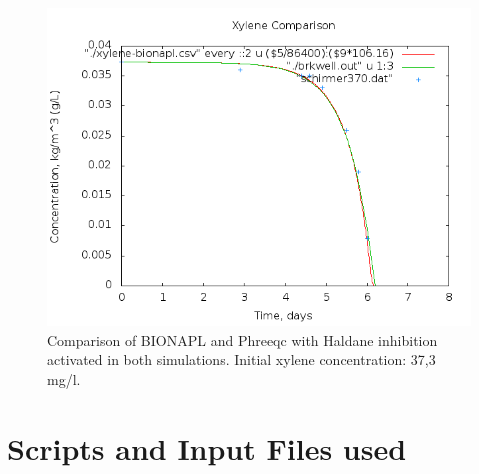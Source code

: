 \documentclass[12pt,twoside]{report}
\begin{document}
\begin{figure}[h]
\includegraphics[width=14cm]{img/comp-xylene37fullhaldane.png}
\caption{Comparison of BIONAPL and Phreeqc with Haldane inhibition activated in both simulations. Initial xylene concentration: 37,3 mg/l.}
\label{4}
\end{figure}


\chapter{Scripts and Input Files used}
\end{document}
